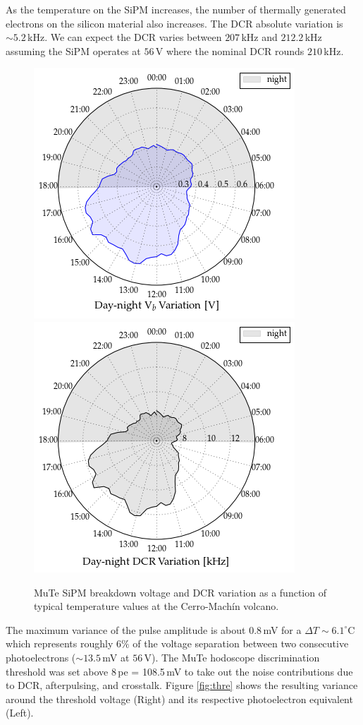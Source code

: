 \documentclass[a4paper,11pt]{article}
\begin{document}
As the temperature on the SiPM increases, the number of thermally generated electrons on the silicon material also increases. The DCR absolute variation is $\sim5.2$\,kHz. We can expect the DCR varies between $207$\,kHz and $212.2$\,kHz assuming the SiPM operates at $56$\,V where the nominal DCR rounds $210$\,kHz. 

\begin{figure}[htbp]
\centering 
\includegraphics[width=.4\textwidth]{Figures/Vb.png}
\includegraphics[width=.4\textwidth]{Figures/DCR.png}
\caption{\label{fig:behav} MuTe SiPM breakdown voltage and DCR variation as a function of typical temperature values at the Cerro-Mach\'in volcano.}
\end{figure}

The maximum variance of the pulse amplitude is about $0.8$\,mV for a $\Delta T \sim 6.1^{\circ}$C which represents roughly $6\%$ of the voltage separation between two consecutive photoelectrons ($\sim13.5$\,mV at $56$\,V). The MuTe hodoscope discrimination threshold was set above $8$\,pe = 108.5\,mV to take out the noise contributions due to DCR, afterpulsing, and crosstalk. Figure \ref{fig:thre} shows the resulting variance around the threshold voltage (Right) and its respective photoelectron equivalent (Left).

\end{document}
